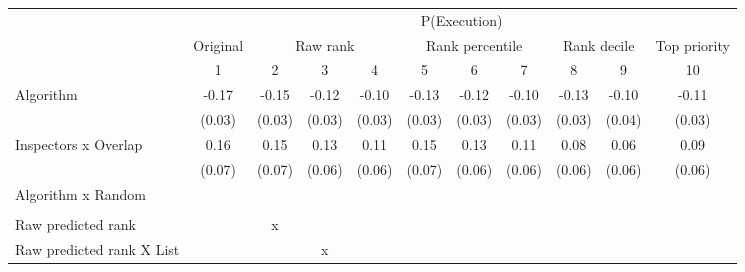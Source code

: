 \begin{tabular}{lcccccccccc} \toprule
\multicolumn{1}{l}{} & \multicolumn{10}{c}{P(Execution)} \\\cmidrule(lr){2-11} \multicolumn{1}{l}{} & Original & \multicolumn{3}{c}{Raw rank} & \multicolumn{3}{c}{Rank percentile} & \multicolumn{2}{c}{Rank decile} & Top priority \\\cmidrule(lr){3-5}\cmidrule(lr){6-8}\cmidrule(lr){9-10}\cmidrule(lr){11-11} \multicolumn{1}{l}{} & 1 & 2 & 3 & 4 & 5 & 6 & 7 & 8 & 9 & 10 \\ \midrule
Algorithm   &       -0.17\sym{***}&       -0.15\sym{***}&       -0.12\sym{***}&       -0.10\sym{***}&       -0.13\sym{***}&       -0.12\sym{***}&       -0.10\sym{***}&       -0.13\sym{***}&       -0.10\sym{***}&       -0.11\sym{***}\\
            &      (0.03)         &      (0.03)         &      (0.03)         &      (0.03)         &      (0.03)         &      (0.03)         &      (0.03)         &      (0.03)         &      (0.04)         &      (0.03)         \\
\addlinespace
Inspectors x Overlap&        0.16\sym{**} &        0.15\sym{**} &        0.13\sym{**} &        0.11\sym{*}  &        0.15\sym{**} &        0.13\sym{**} &        0.11\sym{*}  &        0.08         &        0.06         &        0.09         \\
            &      (0.07)         &      (0.07)         &      (0.06)         &      (0.06)         &      (0.07)         &      (0.06)         &      (0.06)         &      (0.06)         &      (0.06)         &      (0.06)         \\
\addlinespace
Algorithm x Random&                     &                     &                     &                     &                     &                     &                     &                     &                     &                     \\
            &                     &                     &                     &                     &                     &                     &                     &                     &                     &                     \\
\midrule
Raw predicted rank&                     &           x         &                     &                     &                     &                     &                     &                     &                     &                     \\
Raw predicted rank X List&                     &                     &           x         &                     &                     &                     &                     &                     &                     &                     \\

\end{tabular}
